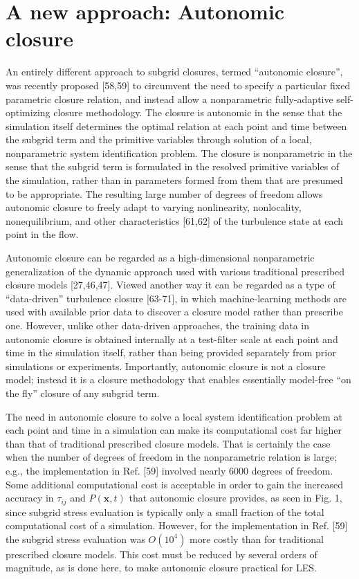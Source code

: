 \section{A new approach: Autonomic closure} 

An entirely different approach to subgrid closures, termed “autonomic closure”, was recently proposed [58,59] to circumvent the need to specify a particular fixed parametric closure relation, and instead allow a nonparametric fully-adaptive self-optimizing closure methodology. The closure is autonomic in the sense that the simulation itself determines the optimal relation at each point and time between the subgrid term and the primitive variables through solution of a local, nonparametric system identification problem. The closure is nonparametric in the sense that the subgrid term is formulated in the resolved primitive variables of the simulation, rather than in parameters formed from them that are presumed to be appropriate. The resulting large number of degrees of freedom allows autonomic closure to freely adapt to varying nonlinearity, nonlocality, nonequilibrium, and other characteristics [61,62] of the turbulence state at each point in the flow. 

Autonomic closure can be regarded as a high-dimensional nonparametric generalization of the dynamic approach used with various traditional prescribed closure models [27,46,47]. Viewed another way it can be regarded as a type of “data-driven” turbulence closure [63-71], in which machine-learning methods are used with available prior data to discover a closure model rather than prescribe one. However, unlike other data-driven approaches, the training data in autonomic closure is obtained internally at a test-filter scale at each point and time in the simulation itself, rather than being provided separately from prior simulations or experiments. Importantly, autonomic closure is not a closure model; instead it is a closure methodology that enables essentially model-free “on the fly” closure of any subgrid term.

The need in autonomic closure to solve a local system identification problem at each point and time in a simulation can make its computational cost far higher than that of traditional prescribed closure models. That is certainly the case when the number of degrees of freedom in the nonparametric relation is large; e.g., the implementation in Ref. [59] involved nearly 6000 degrees of freedom. Some additional computational cost is acceptable in order to gain the increased accuracy in   $\tau_{ij}$   and   $P(\mathbf{x},t)$   that autonomic closure provides, as seen in Fig. 1, since subgrid stress evaluation is typically only a small fraction of the total computational cost of a simulation. However, for the implementation in Ref. [59] the subgrid stress evaluation was  $O(10^4)$  more costly than for traditional prescribed closure models. This cost must be reduced by several orders of magnitude, as is done here, to make autonomic closure practical for LES.  


